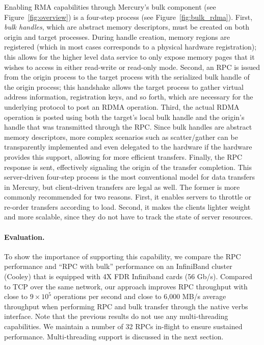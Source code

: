 \documentclass[11pt]{article}
\begin{document}
Enabling RMA capabilities through Mercury's bulk component (see Figure~\ref{fig:overview})
is a four-step process (see Figure~\ref{fig:bulk_rdma}).
First, \textit{bulk handles}, which are abstract memory
descriptors, must be created on both origin and target processes. During
handle creation, memory regions are registered (which in most cases
corresponds to a physical hardware registration); this allows for the
higher level data service to only expose memory pages that it wishes to access in either
read-write or read-only mode. Second, an RPC is issued from the origin
process to the target process with the serialized bulk handle of the origin process;
this handshake allows the target process to gather virtual address information,
registration keys, and so forth, which are necessary for the underlying protocol to post
an RDMA operation.
Third, the actual RDMA operation is posted using both the target's local bulk handle
and the origin's handle that was transmitted through the RPC. Since bulk handles are
abstract memory descriptors, more complex scenarios such as scatter/gather can
be transparently implemented and even delegated to the hardware if the hardware provides this support,
allowing for more efficient transfers. Finally, the RPC response is sent, effectively 
signaling the origin of the transfer completion. This server-driven four-step process is
the most conventional model for data transfers in Mercury, but client-driven transfers are legal
as well. The former is
more commonly recommended for two reasons. First, it enables servers to throttle or
re-order
transfers according to load.  Second, it makes the clients lighter weight and more scalable,
since they do not have to track the state of server resources.

\paragraph{Evaluation.}
To show the importance of supporting this capability, we compare the RPC performance and ``RPC with bulk'' performance
on an InfiniBand cluster (Cooley) that is equipped with 4X FDR Infiniband cards (56 Gb/s).
Compared to TCP over the same network,
our approach improves RPC throughput with close to
$9\times10^{5}$ operations per second and close to 6,000 MB/s average throughput when performing RPC and bulk transfer through the native verbs interface.
Note that the previous results do not use any multi-threading capabilities. We maintain
a number of 32 RPCs in-flight to ensure sustained performance. Multi-threading support is
discussed in the next section.
\end{document}

